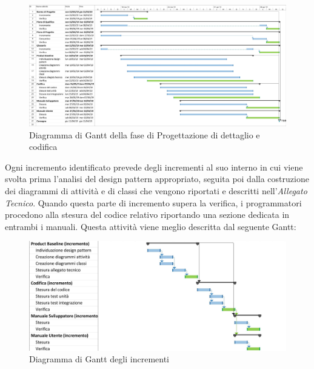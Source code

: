 \begin{figure}[H]
	\includegraphics[width=0.99\linewidth]{res/images/gantt_pd.jpg}
	\caption{Diagramma di Gantt della fase di Progettazione di dettaglio e codifica}
\end{figure}

Ogni incremento identificato prevede degli incrementi al suo interno in cui 
viene svolta prima l'analisi del design pattern appropriato, seguita poi dalla
costruzione dei diagrammi di attività e di classi che vengono riportati e descritti 
nell'\textit{Allegato Tecnico}. Quando questa parte di incremento supera la verifica,
i programmatori procedono alla stesura del codice relativo riportando una sezione 
dedicata in entrambi i manuali. Questa attività viene meglio descritta dal seguente
Gantt:

\begin{figure}[H]
	\includegraphics[width=0.99\linewidth]{res/images/incremento.jpg}
	\caption{Diagramma di Gantt degli incrementi}
\end{figure}



